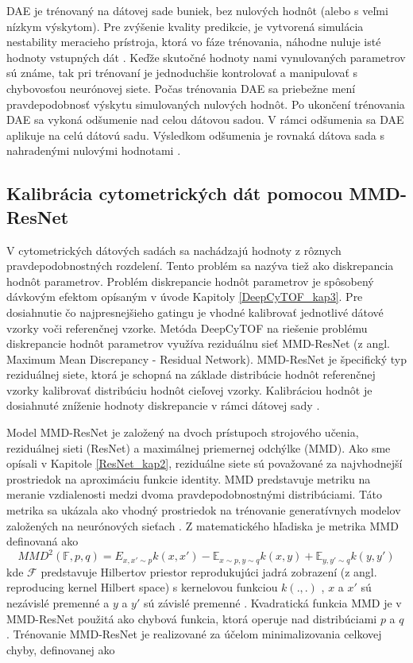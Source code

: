 DAE je trénovaný na dátovej sade buniek, bez nulových hodnôt (alebo s veľmi nízkym výskytom). Pre zvýšenie kvality predikcie, je vytvorená simulácia nestability meracieho prístroja, ktorá vo fáze trénovania, náhodne nuluje isté hodnoty vstupných dát \cite{Li2017}. Keďže skutočné hodnoty nami vynulovaných parametrov sú známe, tak pri trénovaní je jednoduchšie kontrolovať a manipulovať s chybovosťou neurónovej siete. Počas trénovania DAE sa priebežne mení pravdepodobnosť výskytu simulovaných nulových hodnôt. Po ukončení trénovania DAE sa vykoná odšumenie nad celou dátovou sadou. V rámci odšumenia sa DAE aplikuje na celú dátovú sadu. Výsledkom odšumenia je rovnaká dátova sada s nahradenými nulovými hodnotami \cite{Li2017}.

\subsection{Kalibrácia cytometrických dát pomocou MMD-ResNet}
\label{kalibracia_dat}

V cytometrických dátových sadách sa nachádzajú hodnoty z rôznych pravdepodobnostných rozdelení. Tento problém sa nazýva tiež ako diskrepancia hodnôt parametrov. Problém diskrepancie hodnôt parametrov je spôsobený dávkovým efektom opísaným v úvode Kapitoly \ref{DeepCyTOF_kap3}.
Pre dosiahnutie čo najpresnejšieho gatingu je vhodné kalibrovať jednotlivé dátové vzorky voči referenčnej vzorke. Metóda DeepCyTOF na riešenie problému diskrepancie hodnôt parametrov využíva reziduálnu sieť MMD-ResNet (z angl. Maximum Mean Discrepancy - Residual Network). MMD-ResNet je špecifický typ reziduálnej siete, ktorá je schopná na základe distribúcie hodnôt referenčnej vzorky kalibrovať distribúciu hodnôt cieľovej vzorky. Kalibráciou hodnôt je dosiahnuté zníženie hodnoty diskrepancie v rámci dátovej sady \cite{Li2017}.

Model MMD-ResNet je založený na dvoch prístupoch strojového učenia, reziduálnej sieti (ResNet) a maximálnej priemernej odchýlke (MMD). Ako sme opísali v Kapitole \ref{ResNet_kap2}, reziduálne siete sú považované za najvhodnejší prostriedok na aproximáciu funkcie identity. MMD predstavuje metriku na meranie vzdialenosti medzi dvoma pravdepodobnostnými distribúciami. Táto metrika sa ukázala ako vhodný prostriedok na trénovanie generatívnych modelov založených na neurónových sieťach \cite{Li2017, Li2016, He2016, Wu2017}. Z matematického hľadiska je metrika MMD definovaná ako
\begin{equation}
    MMD^2 (\mathbb{F},p,q)=\mathrm{}{E}_{x,x'\sim p}k(x,x') - \mathbb{E}_{x\sim p,y\sim q}k(x,y) + \mathbb{E}_{y,y'\sim q}k(y,y')
\end{equation}
kde $\mathcal{F}$ predstavuje Hilbertov priestor \cite{HilbSpace, Alvarez2012} reprodukujúci jadrá zobrazení (z angl. reproducing kernel Hilbert space) s kernelovou funkciou $k(.,.)$ \cite{Alvarez2012}, $x$ a $x'$ sú nezávislé premenné a $y$ a $y'$ sú závislé premenné \cite{Li2017}. Kvadratická funkcia MMD je v MMD-ResNet použitá ako chybová funkcia, ktorá operuje nad distribúciami $p$ a $q$ \cite{Li2017}. Trénovanie MMD-ResNet je realizované za účelom minimalizovania celkovej chyby, definovanej ako

